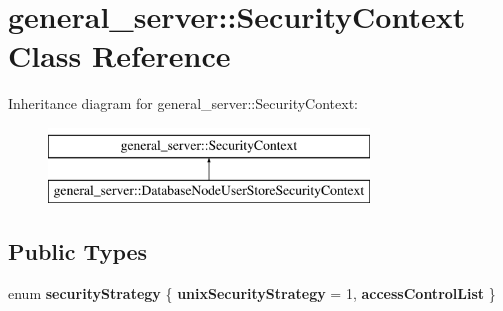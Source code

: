 \hypertarget{classgeneral__server_1_1SecurityContext}{\section{general\-\_\-server\-:\-:\-Security\-Context \-Class \-Reference}
\label{classgeneral__server_1_1SecurityContext}
}
\-Inheritance diagram for general\-\_\-server\-:\-:\-Security\-Context\-:\begin{figure}[H]
\begin{center}
\leavevmode
\includegraphics[height=2.000000cm]{classgeneral__server_1_1SecurityContext}
\end{center}
\end{figure}
\subsection*{\-Public \-Types}
\begin{DoxyCompactItemize}
\item 
enum {\bfseries security\-Strategy} \{ {\bfseries unix\-Security\-Strategy} =  1, 
{\bfseries access\-Control\-List}
 \}
\end{DoxyCompactItemize}
